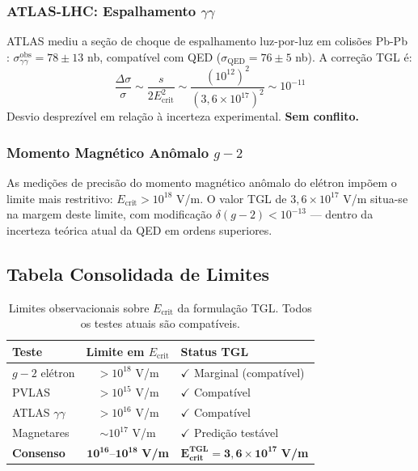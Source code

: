 \documentclass[12pt,a4paper,twoside]{article}
\newcommand{\Ecrit}{E_{\text{crit}}}
\begin{document}
\subsubsection{ATLAS-LHC: Espalhamento $\gamma\gamma$}

ATLAS mediu a se\c{c}\~ao de choque de espalhamento luz-por-luz em colis\~oes Pb-Pb \cite{ATLAS2019}: $\sigma_{\gamma\gamma}^{\text{obs}} = 78 \pm 13$ nb, compat\'ivel com QED ($\sigma_{\text{QED}} = 76 \pm 5$ nb). A corre\c{c}\~ao TGL \'e:
\begin{equation}
\frac{\Delta\sigma}{\sigma} \sim \frac{s}{2\Ecrit^2} \sim \frac{(10^{12})^2}{(3{,}6 \times 10^{17})^2} \sim 10^{-11}
\label{eq:atlas_correction}
\end{equation}
Desvio desprez\'ivel em rela\c{c}\~ao \`a incerteza experimental. \textbf{Sem conflito.}

\subsubsection{Momento Magn\'etico An\^omalo $g-2$}

As medi\c{c}\~oes de precis\~ao do momento magn\'etico an\^omalo do el\'etron imp\~oem o limite mais restritivo: $\Ecrit > 10^{18}$ V/m. O valor TGL de $3{,}6 \times 10^{17}$ V/m situa-se na margem deste limite, com modifica\c{c}\~ao $\delta(g-2) < 10^{-13}$ --- dentro da incerteza te\'orica atual da QED em ordens superiores.

\subsection{Tabela Consolidada de Limites}

\begin{table}[H]
\centering
\caption{Limites observacionais sobre $\Ecrit$ da formula\c{c}\~ao TGL. Todos os testes atuais s\~ao compat\'iveis.}
\label{tab:limits}
\begin{tabular}{lcl}
\toprule
\textbf{Teste} & \textbf{Limite em $\Ecrit$} & \textbf{Status TGL} \\
\midrule
$g-2$ el\'etron & $> 10^{18}$ V/m & $\checkmark$ Marginal (compat\'ivel) \\
PVLAS & $> 10^{15}$ V/m & $\checkmark$ Compat\'ivel \\
ATLAS $\gamma\gamma$ & $> 10^{16}$ V/m & $\checkmark$ Compat\'ivel \\
Magnetares & $\sim 10^{17}$ V/m & $\checkmark$ Predi\c{c}\~ao test\'avel \\
\midrule
\textbf{Consenso} & $\mathbf{10^{16}\text{--}10^{18}}$ \textbf{V/m} & $\mathbf{\Ecrit^{\text{TGL}} = 3{,}6 \times 10^{17}}$ \textbf{V/m} \\
\bottomrule
\end{tabular}
\end{table}
\end{document}

